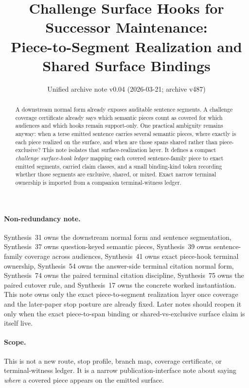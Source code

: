 \documentclass[11pt]{article}
\title{Challenge Surface Hooks for Successor Maintenance:\\[0.5ex]
\large Piece-to-Segment Realization and Shared Surface Bindings}
\author{}
\date{Unified archive note v0.04 (2026-03-21; archive v487)}
\begin{document}
\maketitle

\begin{abstract}
A downstream normal form already exposes auditable sentence segments.
A challenge coverage certificate already says which semantic pieces count as covered for which audiences and which hooks remain support-only.
One practical ambiguity remains anyway: when a terse emitted sentence carries several semantic pieces, where exactly is each piece realized on the surface, and when are those spans shared rather than piece-exclusive?
This note isolates that surface-realization layer.
It defines a compact \emph{challenge surface-hook ledger} mapping each covered sentence-family piece to exact emitted segments, carried claim classes, and a small binding-kind token recording whether those segments are exclusive, shared, or mixed.
Exact narrow terminal ownership is imported from a companion terminal-witness ledger.
\end{abstract}

\paragraph{Non-redundancy note.}
Synthesis~31 owns the downstream normal form and sentence segmentation, Synthesis~37 owns question-keyed semantic pieces, Synthesis~39 owns sentence-family coverage across audiences, Synthesis~41 owns exact piece-hook terminal ownership, Synthesis~54 owns the answer-side terminal citation normal form, Synthesis~74 owns the paired terminal citation discipline, Synthesis~75 owns the paired cutover rule, and Synthesis~17 owns the concrete worked instantiation.
This note owns only the exact piece-to-segment realization layer once coverage and the later-paper stop posture are already fixed. Later notes should reopen it only when the exact piece-to-span binding or shared-vs-exclusive surface claim is itself live.
\paragraph{Scope.}
This is not a new route, stop profile, branch map, coverage certificate, or terminal-witness ledger.
It is a narrow publication-interface note about saying \emph{where} a covered piece appears on the emitted surface.
\end{document}
